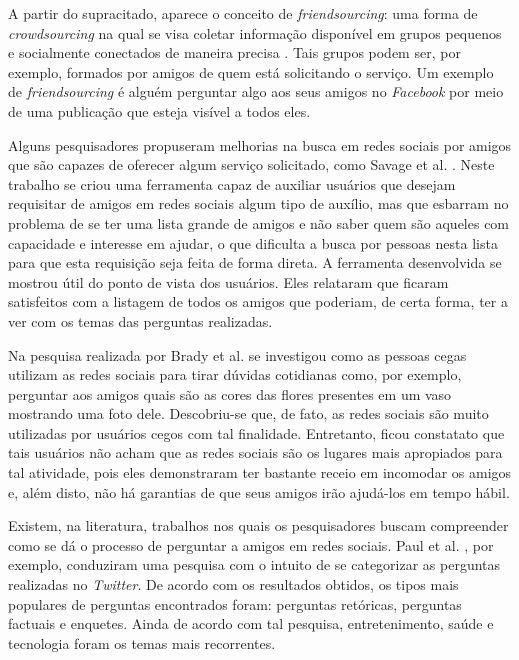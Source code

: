 A partir do supracitado, aparece o conceito de \textit{friendsourcing}: uma forma de \textit{crowdsourcing} na qual se visa coletar informação disponível em grupos pequenos e socialmente conectados de maneira precisa \cite{Bernstein:2008:PVF:1746259.1746260}. Tais grupos podem ser, por exemplo, formados por amigos de quem está solicitando o serviço. Um exemplo de \textit{friendsourcing} é alguém perguntar algo aos seus amigos no \textit{Facebook} por meio de uma publicação que esteja visível a todos eles. 

Alguns pesquisadores propuseram melhorias na busca em redes sociais por amigos que são capazes de oferecer algum serviço solicitado, como Savage et al. \cite{Savage:2012:DSQ:2380296.2380321}. Neste trabalho se criou uma ferramenta capaz de auxiliar usuários que desejam requisitar de amigos em redes sociais algum tipo de auxílio, mas que esbarram no problema de se ter uma lista grande de amigos e não saber quem são aqueles com capacidade e interesse em ajudar, o que dificulta a busca por pessoas nesta lista para que esta requisição seja feita de forma direta. A ferramenta desenvolvida se mostrou útil do ponto de vista dos usuários. Eles relataram que ficaram satisfeitos com a listagem de todos os amigos que poderiam, de certa forma, ter a ver com os temas das perguntas realizadas. 

Na pesquisa realizada por Brady et al. \cite{Brady:2013:IAS:2441776.2441915} se investigou como as pessoas cegas utilizam as redes sociais para tirar dúvidas cotidianas como, por exemplo, perguntar aos amigos quais são as cores das flores presentes em um vaso mostrando uma foto dele. Descobriu-se que, de fato, as redes sociais são muito utilizadas por usuários cegos com tal finalidade. Entretanto, ficou constatato que tais usuários não acham que as redes sociais são os lugares mais apropiados para tal atividade, pois eles demonstraram ter bastante receio em incomodar os amigos e, além disto, não há garantias de que seus amigos irão ajudá-los em tempo hábil.

Existem, na literatura, trabalhos nos quais os pesquisadores buscam compreender como se dá o processo de perguntar a amigos em redes sociais. Paul et al. \cite{paul2011question}, por exemplo, conduziram uma pesquisa com o intuito de se categorizar as perguntas realizadas no \textit{Twitter}. De acordo com os resultados obtidos, os tipos mais populares de perguntas encontrados foram: perguntas retóricas, perguntas factuais e enquetes. Ainda de acordo com tal pesquisa, entretenimento, saúde e tecnologia foram os temas mais recorrentes.  

